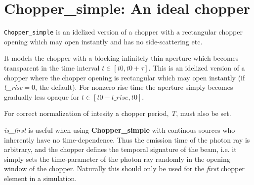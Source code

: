 \section{Chopper\_simple: An ideal chopper}
\texttt{Chopper\_simple} is an idelized version of a chopper with a rectangular chopper opening which may open
instantly and has no side-scattering etc.

It models the chopper with a blocking infinitely thin aperture which becomes transparent
in the time interval $t\in\left[\mathit{t0},\mathit{t0}+\tau\right]$.
This is an idelized version of a chopper where the chopper opening is rectangular which may open
instantly (if \textit{t\_rise}$=0$, the default). For nonzero rise time the aperture simply becomes gradually less opaque
for $t\in\left[\mathit{t0}-\textit{t\_rise},\mathit{t0}\right]$.

For correct normalization of intesity a chopper period, \textit{T}, must also be set.

\textit{is\_first} is useful when using \textbf{Chopper\_simple} with continous sources who inherently have no time-dependence. Thus the emission time of the photon
ray is arbitrary, and the chopper defines the temporal signature of the beam,
i.e. it simply sets the time-parameter of the photon ray randomly in the
opening window of the chopper. Naturally this should only be used for the \emph{first} chopper
element in a simulation.
